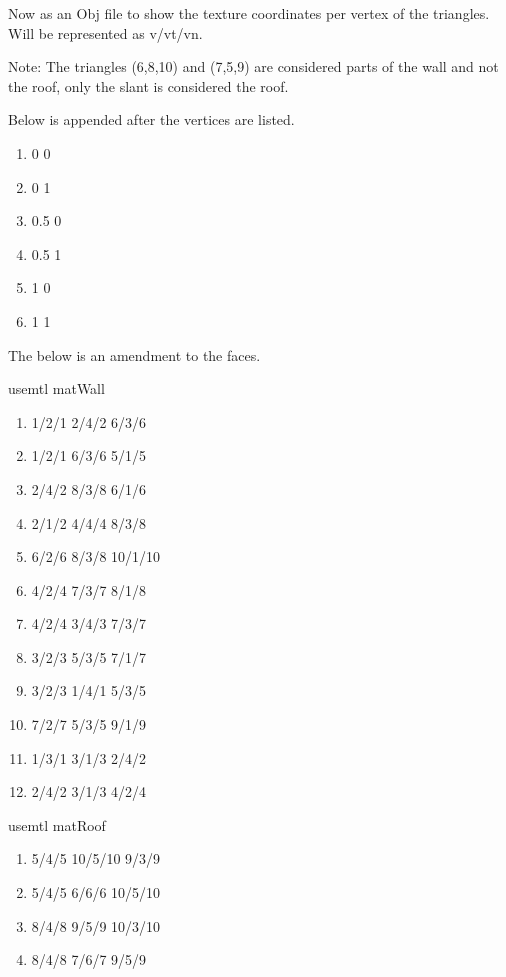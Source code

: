 \documentclass[10pt]{report}
\begin{document}
Now as an Obj file to show the texture coordinates per vertex of the triangles. Will be represented as v/vt/vn. 

Note: The triangles (6,8,10) and (7,5,9) are considered parts of the wall and not the roof, only the slant is considered the roof.

Below is appended after the vertices are listed.
\begin{enumerate}[vt ]
    \item 0 0  %
    \item 0 1  %
    \item 0.5 0  %
    \item 0.5 1  %
    \item 1 0  %
    \item 1 1  %
\end{enumerate}

The below is an amendment to the faces.

usemtl matWall
\begin{enumerate}[f]
    \item 1/2/1 2/4/2 6/3/6
    \item 1/2/1 6/3/6 5/1/5
    \item 2/4/2 8/3/8 6/1/6
    \item 2/1/2 4/4/4 8/3/8
    \item 6/2/6 8/3/8 10/1/10
    \item 4/2/4 7/3/7 8/1/8
    \item 4/2/4 3/4/3 7/3/7
    \item 3/2/3 5/3/5 7/1/7
    \item 3/2/3 1/4/1 5/3/5
    \item 7/2/7 5/3/5 9/1/9
    \item 1/3/1 3/1/3 2/4/2
    \item 2/4/2 3/1/3 4/2/4
\end{enumerate}
usemtl matRoof
\begin{enumerate}[f]
    \item 5/4/5 10/5/10 9/3/9
    \item 5/4/5 6/6/6 10/5/10
    \item 8/4/8 9/5/9 10/3/10
    \item 8/4/8 7/6/7 9/5/9
\end{enumerate}
\end{document}
